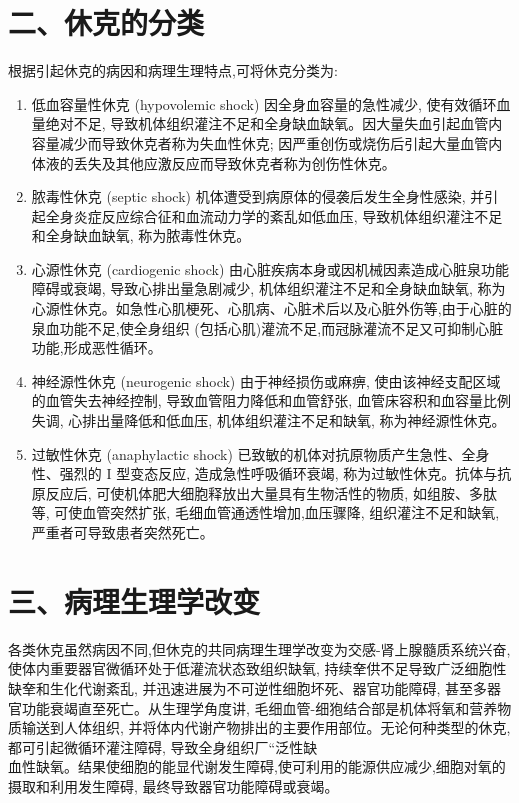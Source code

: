 \documentclass[10pt]{article}
\begin{document}
\section*{二、休克的分类}
根据引起休克的病因和病理生理特点,可将休克分类为:

\begin{enumerate}
  \item 低血容量性休克 (hypovolemic shock) 因全身血容量的急性减少, 使有效循环血量绝对不足, 导致机体组织灌注不足和全身缺血缺氧。因大量失血引起血管内容量减少而导致休克者称为失血性休克; 因严重创伤或烧伤后引起大量血管内体液的丢失及其他应激反应而导致休克者称为创伤性休克。

  \item 脓毒性休克 (septic shock) 机体遭受到病原体的侵袭后发生全身性感染, 并引起全身炎症反应综合征和血流动力学的紊乱如低血压, 导致机体组织灌注不足和全身缺血缺氧, 称为脓毒性休克。

  \item 心源性休克 (cardiogenic shock) 由心脏疾病本身或因机械因素造成心脏泉功能障碍或衰竭, 导致心排出量急剧减少, 机体组织灌注不足和全身缺血缺氧, 称为心源性休克。如急性心肌梗死、心肌病、心脏术后以及心脏外伤等,由于心脏的泉血功能不足,使全身组织 (包括心肌)灌流不足,而冠脉灌流不足又可抑制心脏功能,形成恶性循环。

  \item 神经源性休克 (neurogenic shock) 由于神经损伤或麻痹, 使由该神经支配区域的血管失去神经控制, 导致血管阻力降低和血管舒张, 血管床容积和血容量比例失调, 心排出量降低和低血压, 机体组织灌注不足和缺氧, 称为神经源性休克。

  \item 过敏性休克 (anaphylactic shock) 已致敏的机体对抗原物质产生急性、全身性、强烈的 I 型变态反应, 造成急性呼吸循环衰竭, 称为过敏性休克。抗体与抗原反应后, 可使机体肥大细胞释放出大量具有生物活性的物质, 如组胺、多肽等, 可使血管突然扩张, 毛细血管通透性增加,血压骤降, 组织灌注不足和缺氧, 严重者可导致患者突然死亡。

\end{enumerate}

\section*{三、病理生理学改变}
各类休克虽然病因不同,但休克的共同病理生理学改变为交感-肾上腺髓质系统兴奋,使体内重要器官微循环处于低灌流状态致组织缺氧, 持续羍供不足导致广泛细胞性缺羍和生化代谢紊乱, 并迅速进展为不可逆性细胞坏死、器官功能障碍, 甚至多器官功能衰竭直至死亡。从生理学角度讲, 毛细血管-细狍结合部是机体将氧和营养物质输送到人体组织, 并将体内代谢产物排出的主要作用部位。无论何种类型的休克, 都可引起微循环灌注障碍, 导致全身组织厂“泛性缺\\
血性缺氧。结果使细胞的能显代谢发生障碍,使可利用的能源供应减少,细胞对氧的摄取和利用发生障碍, 最终导致器官功能障碍或衰竭。
\end{document}
